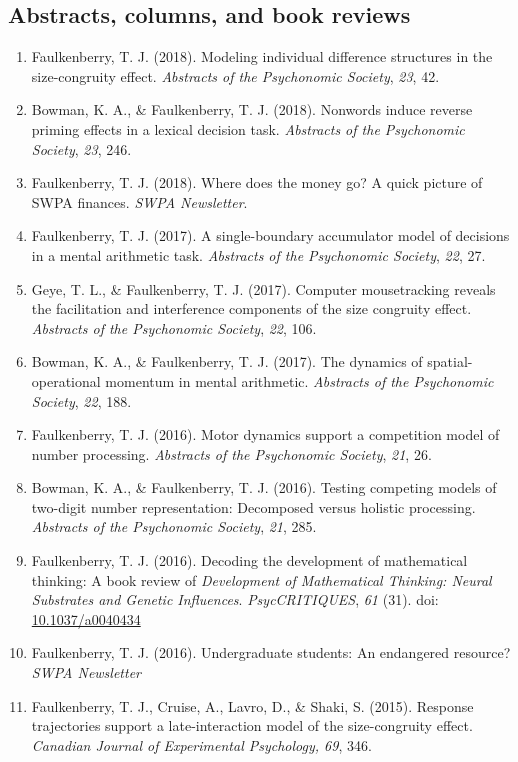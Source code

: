 \documentclass[article,10pt]{article}
\begin{document}
\subsection*{Abstracts, columns, and book reviews}
\label{sec:org36af7c4}
\begin{enumerate}
\item Faulkenberry, T. J. (2018). Modeling individual difference structures in the size-congruity effect. \emph{Abstracts of the Psychonomic Society}, \emph{23}, 42.
\item Bowman, K. A., \& Faulkenberry, T. J. (2018). Nonwords induce reverse priming effects in a lexical decision task. \emph{Abstracts of the Psychonomic Society}, \emph{23}, 246.
\item Faulkenberry, T. J. (2018). Where does the money go? A quick picture of SWPA finances. \emph{SWPA Newsletter}.
\item Faulkenberry, T. J. (2017). A single-boundary accumulator model of decisions in a mental arithmetic task. \emph{Abstracts of the Psychonomic Society}, \emph{22}, 27.
\item Geye, T. L., \& Faulkenberry, T. J. (2017). Computer mousetracking reveals the facilitation and interference components of the size congruity effect. \emph{Abstracts of the Psychonomic Society}, \emph{22}, 106.
\item Bowman, K. A., \& Faulkenberry, T. J. (2017). The dynamics of spatial-operational momentum in mental arithmetic. \emph{Abstracts of the Psychonomic Society}, \emph{22}, 188.
\item Faulkenberry, T. J. (2016). Motor dynamics support a competition model of number processing. \emph{Abstracts of the Psychonomic Society}, \emph{21}, 26.
\item Bowman, K. A., \& Faulkenberry, T. J. (2016). Testing competing models of two-digit number representation: Decomposed versus holistic processing. \emph{Abstracts of the Psychonomic Society}, \emph{21}, 285.
\item Faulkenberry, T. J. (2016). Decoding the development of mathematical thinking: A book review of \emph{Development of Mathematical Thinking: Neural Substrates and Genetic Influences}. \emph{PsycCRITIQUES}, \emph{61} (31). doi: \href{http://dx.doi.org/10.1037/a0040434}{10.1037/a0040434}
\item Faulkenberry, T. J. (2016). Undergraduate students: An endangered resource? \emph{SWPA Newsletter}
\item Faulkenberry, T. J., Cruise, A., Lavro, D., \& Shaki, S. (2015). Response trajectories support a late-interaction model of the size-congruity effect. \emph{Canadian Journal of Experimental Psychology, 69}, 346.

\end{enumerate}
\end{document}
